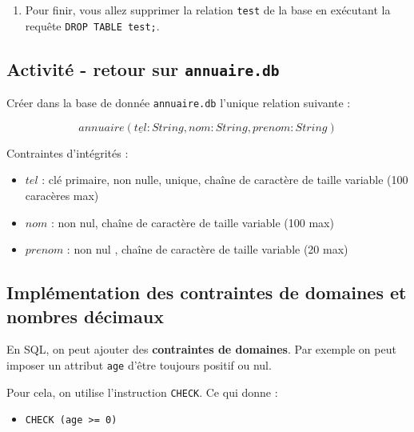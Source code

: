 \documentclass[a4paper,17pt]{extarticle}
\providecommand{\tightlist}{%
      \setlength{\itemsep}{0pt}\setlength{\parskip}{0pt}}
\begin{document}
    \begin{enumerate}
\def\labelenumi{\arabic{enumi}.}
\tightlist
\item
  Pour finir, vous allez supprimer la relation \texttt{test} de la base
  en exécutant la requête \texttt{DROP\ TABLE\ test;}.
\end{enumerate}

    \hypertarget{activituxe9---retour-sur-annuaire.db}{%
\subsection{\texorpdfstring{Activité - retour sur
\texttt{annuaire.db}}{Activité - retour sur annuaire.db}}\label{activituxe9---retour-sur-annuaire.db}}

    Créer dans la base de donnée \texttt{annuaire.db} l'unique relation
suivante :

\[annuaire (\underline{tel}: String ,  nom: String , prenom: String)\]

Contraintes d'intégrités :

\begin{itemize}
\tightlist
\item
  \(tel\) : clé primaire, non nulle, unique, chaîne de caractère de
  taille variable (100 caracères max)
\item
  \(nom\) : non nul, chaîne de caractère de taille variable (100 max)
\item
  \(prenom\) : non nul , chaîne de caractère de taille variable (20 max)
\end{itemize}

    \hypertarget{impluxe9mentation-des-contraintes-de-domaines-et-nombres-duxe9cimaux}{%
\subsection{Implémentation des contraintes de domaines et nombres
décimaux}\label{impluxe9mentation-des-contraintes-de-domaines-et-nombres-duxe9cimaux}}

    En SQL, on peut ajouter des \textbf{contraintes de domaines}. Par
exemple on peut imposer un attribut \texttt{age} d'être toujours positif
ou nul.

Pour cela, on utilise l'instruction \texttt{CHECK}. Ce qui donne :

\begin{itemize}
\tightlist
\item
  \texttt{CHECK\ (age\ \textgreater{}=\ 0)}
\end{itemize}
\end{document}
